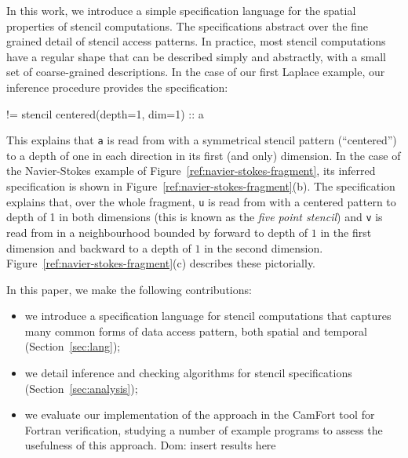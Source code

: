 \documentclass[9pt]{sigplanconf}
\newcommand{\dnote}[1]{\textcolor{darkpurple}{Dom: #1}}
\theoremstyle{definition}
\begin{document}
In this work, we introduce a simple specification language for the
spatial properties of stencil computations. The
specifications abstract over the fine grained detail of stencil access
patterns. In practice, most stencil computations have a regular shape
that can be described simply and abstractly, with a small set of
coarse-grained descriptions. In the case of our first Laplace example,
our inference procedure provides the specification:
%
\begin{SpecVerbatim}
!=  stencil centered(depth=1, dim=1) :: a
\end{SpecVerbatim}
%
This explains that \texttt{a} is read from with a
symmetrical stencil pattern (``centered'') to a depth of one in each
direction in its first (and only) dimension.
In the case of the Navier-Stokes example of
Figure~\ref{ref:navier-stokes-fragment}, its inferred specification is shown
in Figure~\ref{ref:navier-stokes-fragment}(b). The
specification explains that, over the whole fragment, \texttt{u} is
read from with a centered pattern to depth of 1 in both dimensions
(this is known as the \emph{five point stencil}) and \texttt{v}
is read from in a neighbourhood bounded by forward to depth of $1$ in
the first dimension and backward to a depth of $1$ in the second
dimension. Figure~\ref{ref:navier-stokes-fragment}(c) describes these
pictorially.

In this paper, we make the following contributions:
%
\begin{itemize}
\item we introduce a specification language for
stencil computations that captures many common forms
of data access pattern, both spatial and temporal (Section~\ref{sec:lang});
\item we detail inference and checking
algorithms for stencil specifications (Section~\ref{sec:analysis});
\item we evaluate our implementation of the approach
in the CamFort tool for Fortran verification, studying
a number of example programs to assess the usefulness
of this approach.
\dnote{insert results here}
\end{itemize}
%
\end{document}

